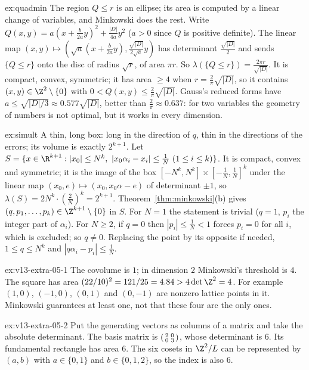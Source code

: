 \begin{solution}{ex:quadmin}
\idea The region $Q\le r$ is an ellipse; its area is computed by a linear change of variables, and Minkowski does the rest.
\writeup Write $Q(x,y)=a(x+\frac b{2a}y)^2+\frac{|D|}{4a}y^2$ ($a>0$ since $Q$ is positive definite). The linear map
$(x,y)\mapsto(\sqrt a(x+\frac b{2a}y),\frac{\sqrt{|D|}}{2\sqrt a}y)$ has determinant $\frac{\sqrt{|D|}}2$ and sends
$\{Q\le r\}$ onto the disc of radius $\sqrt r$, of area $\pi r$. So $\lambda(\{Q\le r\})=\frac{2\pi r}{\sqrt{|D|}}$. It is
compact, convex, symmetric; it has area $\ge4$ when $r=\frac2\pi\sqrt{|D|}$, so it contains $(x,y)\in\Z^2\setminus\{0\}$
with $0<Q(x,y)\le\frac2\pi\sqrt{|D|}$. Gauss's reduced forms have $a\le\sqrt{|D|/3}\approx0.577\sqrt{|D|}$, better than
$\frac2\pi\approx0.637$: for two variables the geometry of numbers is not optimal, but it works in every dimension.
\end{solution}

\begin{solution}{ex:simult}
\idea A thin, long box: long in the direction of $q$, thin in the directions of the errors; its volume is exactly $2^{k+1}$.
\writeup Let $S=\{x\in\R^{k+1}:|x_0|\le N^k,\ |x_0\alpha_i-x_i|\le\frac1N\ (1\le i\le k)\}$. It is compact, convex and
symmetric; it is the image of the box $[-N^k,N^k]\times[-\frac1N,\frac1N]^k$ under the linear map $(x_0,e)\mapsto(x_0,
x_0\alpha-e)$ of determinant $\pm1$, so $\lambda(S)=2N^k\cdot(\frac2N)^k=2^{k+1}$. Theorem~\ref{thm:minkowski}(b) gives
$(q,p_1,\dots,p_k)\in\Z^{k+1}\setminus\{0\}$ in $S$. For $N=1$ the statement is trivial ($q=1$, $p_i$ the integer part
of $\alpha_i$). For $N\ge2$, if $q=0$ then $|p_i|\le\frac1N<1$ forces $p_i=0$ for all $i$, which is excluded; so $q\ne0$. Replacing the point
by its opposite if needed, $1\le q\le N^k$ and $|q\alpha_i-p_i|\le\frac1N$.
\end{solution}

\begin{solution}{ex:v13-extra-05-1}
\idea The covolume is $1$; in dimension $2$ Minkowski's threshold is $4$.
\writeup The square has area $(22/10)^2=121/25=4.84>4\det\Z^2=4$. For example $(1,0)$, $(-1,0)$, $(0,1)$ and $(0,-1)$ are nonzero lattice points in it. Minkowski guarantees at least one, not that these four are the only ones.
\end{solution}

\begin{solution}{ex:v13-extra-05-2}
\idea Put the generating vectors as columns of a matrix and take the absolute determinant.
\writeup The basis matrix is $\begin{psmallmatrix}2&0\\0&3\end{psmallmatrix}$, whose determinant is $6$. Its fundamental rectangle has area $6$. The six cosets in $\Z^2/L$ can be represented by $(a,b)$ with $a\in\{0,1\}$ and $b\in\{0,1,2\}$, so the index is also $6$.
\end{solution}

